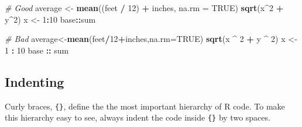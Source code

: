 \documentclass[]{book}
\newenvironment{Shaded}{\begin{snugshade}}{\end{snugshade}}
\newcommand{\KeywordTok}[1]{\textcolor[rgb]{0.13,0.29,0.53}{\textbf{#1}}}
\newcommand{\DataTypeTok}[1]{\textcolor[rgb]{0.13,0.29,0.53}{#1}}
\newcommand{\DecValTok}[1]{\textcolor[rgb]{0.00,0.00,0.81}{#1}}
\newcommand{\StringTok}[1]{\textcolor[rgb]{0.31,0.60,0.02}{#1}}
\newcommand{\CommentTok}[1]{\textcolor[rgb]{0.56,0.35,0.01}{\textit{#1}}}
\newcommand{\OtherTok}[1]{\textcolor[rgb]{0.56,0.35,0.01}{#1}}
\newcommand{\OperatorTok}[1]{\textcolor[rgb]{0.81,0.36,0.00}{\textbf{#1}}}
\newcommand{\NormalTok}[1]{#1}
\theoremstyle{definition}
\theoremstyle{definition}
\theoremstyle{definition}
\theoremstyle{remark}
\begin{document}
\begin{Shaded}
\begin{Highlighting}[]
\CommentTok{# Good}
\NormalTok{average <-}\StringTok{ }\KeywordTok{mean}\NormalTok{((feet }\OperatorTok{/}\StringTok{ }\DecValTok{12}\NormalTok{) }\OperatorTok{+}\StringTok{ }\NormalTok{inches, }\DataTypeTok{na.rm =} \OtherTok{TRUE}\NormalTok{)}
\KeywordTok{sqrt}\NormalTok{(x}\OperatorTok{^}\DecValTok{2} \OperatorTok{+}\StringTok{ }\NormalTok{y}\OperatorTok{^}\DecValTok{2}\NormalTok{)}
\NormalTok{x <-}\StringTok{ }\DecValTok{1}\OperatorTok{:}\DecValTok{10}
\NormalTok{base}\OperatorTok{::}\NormalTok{sum}

\CommentTok{# Bad}
\NormalTok{average<-}\KeywordTok{mean}\NormalTok{(feet}\OperatorTok{/}\DecValTok{12}\OperatorTok{+}\NormalTok{inches,}\DataTypeTok{na.rm=}\OtherTok{TRUE}\NormalTok{)}
\KeywordTok{sqrt}\NormalTok{(x }\OperatorTok{^}\StringTok{ }\DecValTok{2} \OperatorTok{+}\StringTok{ }\NormalTok{y }\OperatorTok{^}\StringTok{ }\DecValTok{2}\NormalTok{)}
\NormalTok{x <-}\StringTok{ }\DecValTok{1} \OperatorTok{:}\StringTok{ }\DecValTok{10}
\NormalTok{base }\OperatorTok{::}\StringTok{ }\NormalTok{sum}
\end{Highlighting}
\end{Shaded}

\subsection{Indenting}\label{indenting}

Curly braces, \texttt{\{\}}, define the the most important hierarchy of
R code. To make this hierarchy easy to see, always indent the code
inside \texttt{\{\}} by two spaces.
\end{document}
